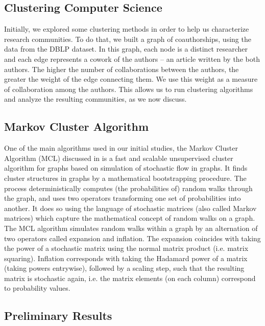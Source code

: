 \documentclass[msc]{ppgccufmg}
\begin{document}
\begin{appendices}
\chapter{Clustering Computer Science}\label{sec:clustering}

Initially, we explored some clustering methods in order to help us characterize research communities. To do that, we built a graph of coauthorships, using the data from the DBLP dataset. In this graph, each node is a distinct researcher and each edge represents a cowork of the authors -- an article written by the both authors. The higher the number of collaborations between the authors, the greater the weight of the edge connecting them. We use this weight as a measure of collaboration among the authors. This allows us to run clustering algorithms and analyze the resulting communities, as we now discuss.

\section{Markov Cluster Algorithm}

One of the main algorithms used in our initial studies, the Markov Cluster Algorithm (MCL) discussed in \citep{mcl} is a fast and scalable unsupervised cluster algorithm for graphs based on simulation of stochastic flow in graphs. It finds cluster structures in graphs by a mathematical bootstrapping procedure. The process deterministically computes (the probabilities of) random walks through the graph, and uses two operators transforming one set of probabilities into another. It does so using the language of stochastic matrices (also called Markov matrices) which capture the mathematical concept of random walks on a graph.
The MCL algorithm simulates random walks within a graph by an alternation of two operators called expansion and inflation. The expansion coincides with taking the power of a stochastic matrix using the normal matrix product (i.e. matrix squaring). Inflation corresponds with taking the Hadamard power of a matrix (taking powers entrywise), followed by a scaling step, such that the resulting matrix is stochastic again, i.e. the matrix elements (on each column) correspond to probability values.

\section{Preliminary Results}


\end{appendices}
\end{document}
